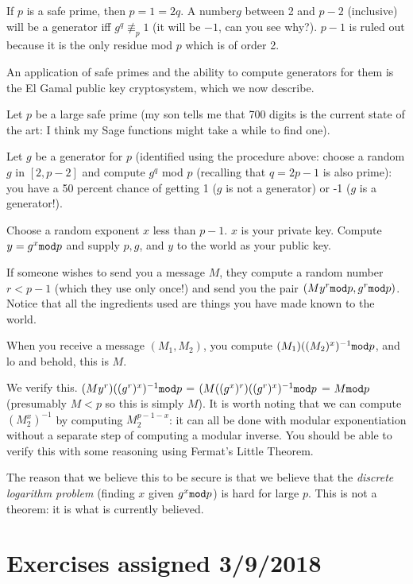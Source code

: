 \documentclass[12pt]{article}
\begin{document}
If $p$ is a safe prime, then $p=1=2q$.  A number$g$  between 2 and $p-2$ (inclusive) will be a generator iff $g^q \not\equiv_p 1$ (it will be $-1$, can you see why?).  $p-1$ is ruled out because it is the only residue mod $p$ which is of order 2.

An application of safe primes and the ability to compute generators for them is the El Gamal public key cryptosystem, which we now describe.

Let $p$ be a large safe prime (my son tells me that 700 digits is the current state of the art:  I think my Sage functions might take a while to find one).

Let $g$ be a generator for $p$ (identified using the procedure above:  choose a random $g$ in $[2,p-2]$ and compute $g^q$ mod $p$ (recalling that $q=2p-1$ is also prime):  you have a 50 percent chance of getting 1 ($g$ is not a generator) or -1 ($g$ is a generator!).

Choose a random exponent $x$ less than $p-1$.  $x$ is your private key.  Compute $y=g^x {\tt mod} p$ and supply $p, g$, and $y$ to the world as your public key.

If someone wishes to send you a message $M$, they compute a random number $r<p-1$ (which they use only once!) and send you the pair $(My^r {\tt mod} p,g^r{\tt mod}p)$.  Notice that all the ingredients used are things you have made known to the world.

When you receive a message $(M_1,M_2)$, you compute $(M_1)((M_2)^{x})^{-1}{\tt mod}p$, and lo and behold, this is $M$.

We verify this.  $(My^r)((g^r)^{x})^{-1}{\tt mod}p$ = $(M((g^x)^r)((g^r)^x)^{-1}{\tt mod}p$ = $M{\tt mod} p$ (presumably $M <p$ so this is simply $M$).  It is worth noting
that we can compute $(M_2^x)^{-1}$ by computing $M_2^{p-1-x}$:  it can all be done with modular exponentiation without a separate step of computing a modular inverse.  You should be able to verify this with some reasoning using Fermat's Little Theorem.

The reason that we believe this to be secure is that we believe that the {\em discrete logarithm problem\/} (finding $x$ given $g^x {\tt mod} p$) is hard for large $p$.  This is not a theorem:  it is what is currently believed.

\section{Exercises assigned 3/9/2018}
\end{document}
